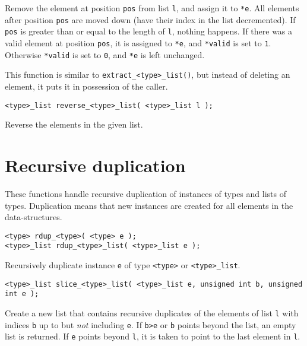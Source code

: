 \begin{desc}
Remove the element at position {\tt pos} from list {\tt l},
and assign it to \verb'*e'.
All elements after position {\tt pos} are moved down
(have their index in the list decremented).
If {\tt pos} is greater than or equal to the length of {\tt l},
nothing happens.
If there was a valid element at position {\tt pos}, it is assigned
to \verb'*e', and \verb'*valid' is set to {\tt 1}. Otherwise
\verb'*valid' is set to {\tt 0}, and \verb'*e' is left unchanged.
\par
This function is similar to \verb'extract_<type>_list()', but instead
of deleting an element, it puts it in possession of the caller.
\end{desc}
\begin{verbatim}
<type>_list reverse_<type>_list( <type>_list l );
\end{verbatim}
\begin{desc}
Reverse the elements in the given list.
\end{desc}
\section{Recursive duplication}
These functions handle recursive duplication of instances of types and
lists of types.
Duplication means that new instances are created for all elements
in the data-structures.
\begin{verbatim}
<type> rdup_<type>( <type> e );
<type>_list rdup_<type>_list( <type>_list e );
\end{verbatim}
\begin{desc}
Recursively duplicate instance {\tt e} of type {\tt <type>} or
{\tt <type>\_list}.
\end{desc}
\begin{verbatim}
<type>_list slice_<type>_list( <type>_list e, unsigned int b, unsigned int e );
\end{verbatim}
\begin{desc}
Create a new list that contains recursive duplicates of the elements of
list {\tt l} with indices {\tt b} up to but {\em not} including {\tt e}.
If {\tt b>e} or {\tt b} points beyond the list,
an empty list is returned.
If {\tt e} points beyond {\tt l},
it is taken to point to the last element in {\tt l}.
\end{desc}
